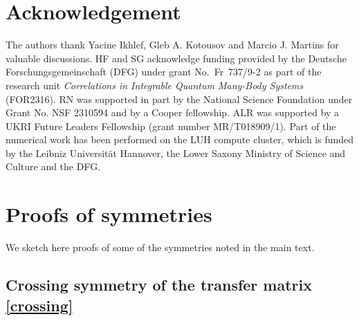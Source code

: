 \documentclass[12pt]{article}
\numberwithin{equation}{section}
\begin{document}
\section*{Acknowledgement}
  The authors thank Yacine Ikhlef, Gleb A. Kotousov and Marcio J. Martins for valuable discussions. HF and SG acknowledge funding provided by the Deutsche Forschungsgemeinschaft (DFG) under grant No.\ Fr~737/9-2 as part of the research unit   \textit{Correlations in Integrable Quantum Many-Body Systems} (FOR2316). RN was supported in part by
   the National Science Foundation under Grant No. NSF 2310594 and by a Cooper fellowship. ALR was supported by a UKRI Future Leaders Fellowship (grant number MR/T018909/1). Part of  the numerical work has been performed on the LUH compute cluster, which is funded by the Leibniz Universität Hannover, the Lower Saxony Ministry of Science and Culture and the DFG. 

\appendix

\section{Proofs of symmetries}\label{sec:proofs}

We sketch here proofs of some of the symmetries noted in the main text.

\subsection{Crossing symmetry of the transfer matrix \eqref{crossing}}
\end{document}
